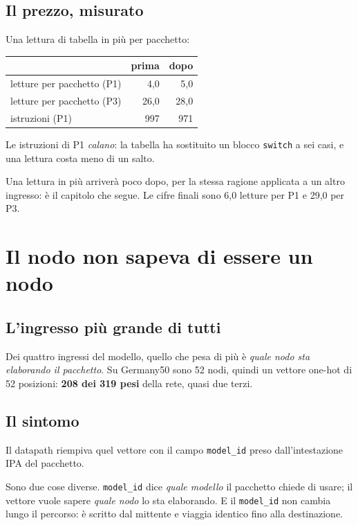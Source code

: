 \documentclass[11pt,a4paper,oneside]{report}
\begin{document}
\section{Il prezzo, misurato}

Una lettura di tabella in più per pacchetto:

\begin{center}
\small
\begin{tabular}{@{}lrr@{}}
\toprule
& \textbf{prima} & \textbf{dopo} \\
\midrule
letture per pacchetto (P1) & 4,0 & 5,0 \\
letture per pacchetto (P3) & 26,0 & 28,0 \\
istruzioni (P1) & 997 & 971 \\
\bottomrule
\end{tabular}
\end{center}

Le istruzioni di P1 \emph{calano}: la tabella ha sostituito un blocco
\texttt{switch} a sei casi, e una lettura costa meno di un salto.

Una lettura in più arriverà poco dopo, per la stessa ragione applicata a un
altro ingresso: è il capitolo che segue. Le cifre finali sono 6,0 letture per
P1 e 29,0 per P3.

\chapter{Il nodo non sapeva di essere un nodo}

\section{L'ingresso più grande di tutti}

Dei quattro ingressi del modello, quello che pesa di più è \emph{quale nodo sta
elaborando il pacchetto}. Su Germany50 sono 52 nodi, quindi un vettore one-hot
di 52 posizioni: \textbf{208 dei 319 pesi} della rete, quasi due terzi.

\section{Il sintomo}

Il datapath riempiva quel vettore con il campo \texttt{model\_id} preso
dall'intestazione IPA del pacchetto.

Sono due cose diverse. \texttt{model\_id} dice \emph{quale modello} il pacchetto
chiede di usare; il vettore vuole sapere \emph{quale nodo} lo sta elaborando. E
il \texttt{model\_id} non cambia lungo il percorso: è scritto dal mittente e
viaggia identico fino alla destinazione.
\end{document}

